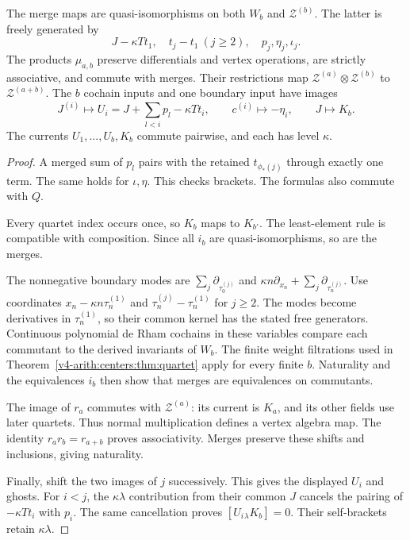 \begin{lemma}
\label{v4-arith:centers:lem:tower}
The merge maps are quasi-isomorphisms on both $W_b$ and
$\mathcal Z^{(b)}$. The latter is freely generated by
\[
 J-\kappa Tt_1,\quad t_j-t_1\ (j\geq2),\quad
 p_j,\eta_j,\iota_j.
\]
The products $\mu_{a,b}$ preserve differentials and vertex
operations, are strictly associative, and commute with merges.
Their restrictions map
$\mathcal Z^{(a)}\otimes\mathcal Z^{(b)}$
to $\mathcal Z^{(a+b)}$.
The $b$ cochain inputs and one boundary input have images
\[
 J^{(i)}\mapsto U_i=J+\sum_{l<i}p_l-\kappa Tt_i,\qquad
 c^{(i)}\mapsto-\eta_i,\qquad J\mapsto K_b.
\]
The currents $U_1,\ldots,U_b,K_b$ commute pairwise,
and each has level $\kappa$.
\end{lemma}

\begin{proof}
A merged sum of $p_l$ pairs with the retained $t_{\phi_*(j)}$
through exactly one term. The same holds for $\iota,\eta$.
This checks brackets. The formulas also commute with $Q$.

Every quartet index occurs once, so $K_b$ maps to $K_{b'}$.
The least-element rule is compatible with composition.
Since all $i_b$ are quasi-isomorphisms, so are the merges.

The nonnegative boundary modes are
$\sum_j\partial_{\tau_0^{(j)}}$ and
$\kappa n\partial_{x_n}+\sum_j\partial_{\tau_n^{(j)}}$.
Use coordinates
$x_n-\kappa n\tau_n^{(1)}$ and
$\tau_n^{(j)}-\tau_n^{(1)}$ for $j\geq2$.
The modes become derivatives in $\tau_n^{(1)}$,
so their common kernel has the stated free generators.
Continuous polynomial de Rham cochains in these variables
compare each commutant to the derived invariants of $W_b$.
The finite weight filtrations used in
Theorem~\ref{v4-arith:centers:thm:quartet}
apply for every finite $b$. Naturality and the equivalences
$i_b$ then show that merges are equivalences on commutants.

The image of $r_a$ commutes with $\mathcal Z^{(a)}$:
its current is $K_a$, and its other fields use later quartets.
Thus normal multiplication defines a vertex algebra map.
The identity $r_ar_b=r_{a+b}$ proves associativity.
Merges preserve these shifts and inclusions, giving naturality.

Finally, shift the two images of $j$ successively.
This gives the displayed $U_i$ and ghosts.
For $i<j$, the $\kappa\lambda$ contribution from their
common $J$ cancels the pairing of $-\kappa Tt_i$ with $p_i$.
The same cancellation proves $[U_i{}_\lambda K_b]=0$.
Their self-brackets retain $\kappa\lambda$.
\end{proof}

